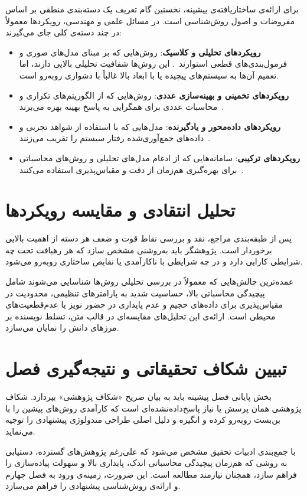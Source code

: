 برای ارائه‌ی ساختاریافته‌ی پیشینه، نخستین گام تعریف یک دسته‌بندی منطقی بر اساس مفروضات و اصول روش‌شناسی است. در مسائل علمی و مهندسی، رویکردها معمولاً در چند دسته‌ی کلی جای می‌گیرند:
\begin{itemize}
    \item \textbf{رویکردهای تحلیلی و کلاسیک}: روش‌هایی که بر مبنای مدل‌های صوری و فرمول‌بندی‌های قطعی استوارند~\cite{sample_book, sample_inproceedings}. این روش‌ها شفافیت تحلیلی بالایی دارند، اما تعمیم آن‌ها به سیستم‌های پیچیده یا با ابعاد بالا غالباً با دشواری روبه‌رو است.
    \vspace{-0.25cm}
    \item \textbf{رویکردهای تخمینی و بهینه‌سازی عددی}: روش‌هایی که از الگوریتم‌های تکراری و محاسبات عددی برای همگرایی به پاسخ بهینه بهره می‌برند~\cite{sample_article, sample_inbook, sample_unpublished}.
    \vspace{-0.25cm}
    \item \textbf{رویکردهای داده‌محور و یادگیرنده}: مدل‌هایی که با استفاده از شواهد تجربی و داده‌های جمع‌آوری‌شده رفتار سیستم را تقریب می‌زنند~\cite{sample_incollection, sample_techreport, sample_manual, sample_booklet}.
    \vspace{-0.25cm}
    \item \textbf{رویکردهای ترکیبی}: سامانه‌هایی که از ادغام مدل‌های تحلیلی و روش‌های محاسباتی برای بهره‌گیری هم‌زمان از دقت و مقیاس‌پذیری استفاده می‌کنند~\cite{sample_proceedings, sample_misc, sample_phdthesis, sample_mastersthesis}.
\end{itemize}


\section{تحلیل انتقادی و مقایسه رویکردها}\label{sec:3-2}

پس از طبقه‌بندی مراجع، نقد و بررسی نقاط قوت و ضعف هر دسته از اهمیت بالایی برخوردار است. پژوهشگر باید به‌روشنی مشخص سازد که هر رهیافت تحت چه شرایطی کارایی دارد و در چه شرایطی با ناکارآمدی یا نقایص ساختاری روبه‌رو می‌شود.

عمده‌ترین چالش‌هایی که معمولاً در بررسی تحلیلی روش‌ها شناسایی می‌شوند شامل پیچیدگی محاسباتی بالا، حساسیت شدید به پارامترهای تنظیمی، محدودیت در مقیاس‌پذیری برای داده‌های حجیم و عدم پایداری در حضور نویز یا عدم‌قطعیت‌های محیطی است. ارائه‌ی این تحلیل‌های مقایسه‌ای در قالب متن، تسلط نویسنده بر مرزهای دانش را نمایان می‌سازد.


\section{تبیین شکاف تحقیقاتی و نتیجه‌گیری فصل}\label{sec:3-3}

بخش پایانی فصل پیشینه باید به بیان صریح «شکاف پژوهشی» بپردازد. شکاف پژوهشی همان پرسش یا نیاز پاسخ‌داده‌نشده‌ای است که کارآمدی روش‌های پیشین را با بن‌بست روبه‌رو کرده و انگیزه و دلیل اصلی طراحی متدولوژی پیشنهادی را توجیه می‌نماید.

با جمع‌بندی ادبیات تحقیق مشخص می‌شود که علی‌رغم پژوهش‌های گسترده، دستیابی به روشی که هم‌زمان پیچیدگی محاسباتی اندک، پایداری بالا و سهولت پیاده‌سازی را فراهم سازد، همچنان نیازمند مطالعه است. این ضرورت، زمینه‌ی ورود به فصل چهارم و ارائه‌ی روش‌شناسی پیشنهادی را فراهم می‌سازد.
